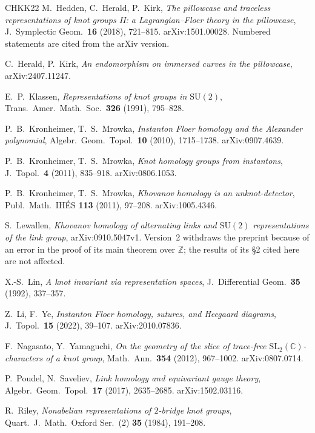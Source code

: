 \documentclass[11pt,reqno]{amsart}
\theoremstyle{plain}
\theoremstyle{definition}
\newcommand{\Z}{\mathbb{Z}}
\newcommand{\C}{\mathbb{C}}
\newcommand{\SU}{\mathrm{SU}(2)}
\begin{document}
\begin{thebibliography}{CHKK22}
 M.~Hedden, C.~Herald, P.~Kirk, \emph{The pillowcase and traceless representations of knot
groups II: a Lagrangian--Floer theory in the pillowcase}, J.\ Symplectic Geom.\ \textbf{16} (2018),
721--815. arXiv:1501.00028. Numbered statements are cited from the arXiv version.

 C.~Herald, P.~Kirk, \emph{An endomorphism on immersed curves in the pillowcase},
arXiv:2407.11247.

 E.~P.~Klassen, \emph{Representations of knot groups in $\SU$}, Trans.\ Amer.\ Math.\
Soc.\ \textbf{326} (1991), 795--828.

 P.~B.~Kronheimer, T.~S.~Mrowka, \emph{Instanton Floer homology and the
Alexander polynomial}, Algebr.\ Geom.\ Topol.\ \textbf{10} (2010), 1715--1738. arXiv:0907.4639.

 P.~B.~Kronheimer, T.~S.~Mrowka, \emph{Knot homology groups from instantons}, J.\ Topol.\
\textbf{4} (2011), 835--918. arXiv:0806.1053.

 P.~B.~Kronheimer, T.~S.~Mrowka, \emph{Khovanov homology is an unknot-detector}, Publ.\
Math.\ IH\'ES \textbf{113} (2011), 97--208. arXiv:1005.4346.

\bibitem[Lew09]{Lewallen} S.~Lewallen, \emph{Khovanov homology of alternating links and $\SU$ representations
of the link group}, arXiv:0910.5047v1. Version~2 withdraws the preprint because of an error in the proof
of its main theorem over $\Z$; the results of its \S2 cited here are not affected.

\bibitem[Lin92]{Lin} X.-S.~Lin, \emph{A knot invariant via representation spaces}, J.\ Differential Geom.\
\textbf{35} (1992), 337--357.

 Z.~Li, F.~Ye, \emph{Instanton Floer homology, sutures, and Heegaard diagrams},
J.\ Topol.\ \textbf{15} (2022), 39--107. arXiv:2010.07836.

 F.~Nagasato, Y.~Yamaguchi, \emph{On the geometry of the slice of trace-free
$\mathrm{SL}_2(\C)$-characters of a knot group}, Math.\ Ann.\ \textbf{354} (2012), 967--1002.
arXiv:0807.0714.

\bibitem[PS17]{PS} P.~Poudel, N.~Saveliev, \emph{Link homology and equivariant gauge theory},
Algebr.\ Geom.\ Topol.\ \textbf{17} (2017), 2635--2685. arXiv:1502.03116.

 R.~Riley, \emph{Nonabelian representations of $2$-bridge knot groups}, Quart.\ J.\ Math.\
Oxford Ser.\ (2) \textbf{35} (1984), 191--208.


\end{thebibliography}
\end{document}
